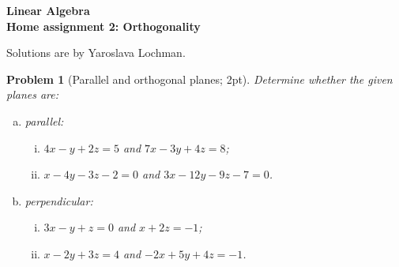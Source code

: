 \documentclass[12pt,a4]{article}
\newtheorem{problem}{Problem}
\begin{document}
\begin{center}
  \Large\bf{Linear Algebra\\
    Home assignment 2: Orthogonality}
\end{center}
Solutions are by Yaroslava Lochman.


\begin{problem}[Parallel and orthogonal planes; 2pt]\rm	Determine whether the given planes are:
		\begin{enumerate}[(a)]
		\item parallel: \begin{enumerate}[(i)]
			\item $4x-y+2z=5$ and $7x-3y+4z=8$;
			\item $x-4y-3z-2=0$ and $3x-12y-9z-7=0$.
		\end{enumerate}
 		\item perpendicular:
		\begin{enumerate}[(i)]
			\item $3x-y+z=0$ and $x+2z=-1$;
			\item $x-2y+3z=4$ and $-2x+5y+4z=-1$.
		\end{enumerate}
	\end{enumerate}
\end{problem}
\end{document}
